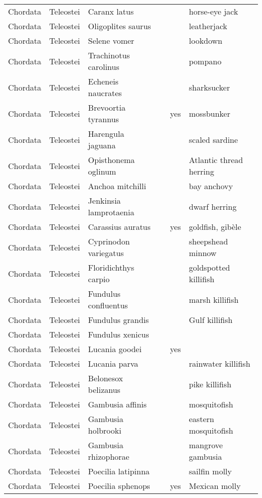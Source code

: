 \begin{longtable}{llllll}
  Chordata & Teleostei & Caranx latus &  &  & horse-eye jack \\ 
  Chordata & Teleostei & Oligoplites saurus &  &  & leatherjack \\ 
  Chordata & Teleostei & Selene vomer &  &  & lookdown \\ 
  Chordata & Teleostei & Trachinotus carolinus &  &  & pompano \\ 
  Chordata & Teleostei & Echeneis naucrates &  &  & sharksucker \\ 
  Chordata & Teleostei & Brevoortia tyrannus &  & yes & mossbunker \\ 
  Chordata & Teleostei & Harengula jaguana &  &  & scaled sardine \\ 
  Chordata & Teleostei & Opisthonema oglinum &  &  & Atlantic thread herring \\ 
  Chordata & Teleostei & Anchoa mitchilli &  &  & bay anchovy \\ 
  Chordata & Teleostei & Jenkinsia lamprotaenia &  &  & dwarf herring \\ 
  Chordata & Teleostei & Carassius auratus &  & yes & goldfish, gibèle \\ 
  Chordata & Teleostei & Cyprinodon variegatus &  &  & sheepshead minnow \\ 
  Chordata & Teleostei & Floridichthys carpio &  &  & goldspotted killifish \\ 
  Chordata & Teleostei & Fundulus confluentus &  &  & marsh killifish \\ 
  Chordata & Teleostei & Fundulus grandis &  &  & Gulf killifish \\ 
  Chordata & Teleostei & Fundulus xenicus &  &  &  \\ 
  Chordata & Teleostei & Lucania goodei &  & yes &  \\ 
  Chordata & Teleostei & Lucania parva &  &  & rainwater killifish \\ 
  Chordata & Teleostei & Belonesox belizanus &  &  & pike killifish \\ 
  Chordata & Teleostei & Gambusia affinis &  &  & mosquitofish \\ 
  Chordata & Teleostei & Gambusia holbrooki &  &  & eastern mosquitofish \\ 
  Chordata & Teleostei & Gambusia rhizophorae &  &  & mangrove gambusia \\ 
  Chordata & Teleostei & Poecilia latipinna &  &  & sailfin molly \\ 
  Chordata & Teleostei & Poecilia sphenops &  & yes & Mexican molly \\ 

\end{longtable}
